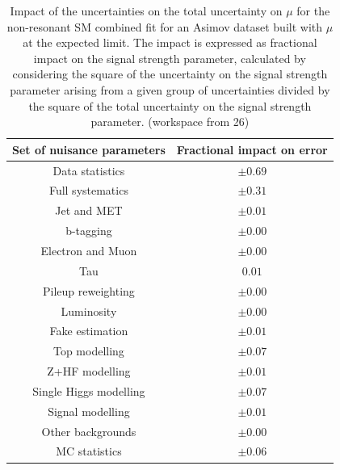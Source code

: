\begin{table}
\centering
\begin{tabular}{|c|c|}
\hline
Set of nuisance parameters & Fractional impact on error\\
\hline
Data statistics & $\pm 0.69$\\
Full systematics & $\pm 0.31$\\
Jet and MET & $\pm 0.01$ \\
b-tagging & $\pm 0.00$\\
Electron and Muon & $\pm 0.00$\\
Tau & $0.01$\\
Pileup reweighting & $\pm 0.00$\\
Luminosity & $\pm 0.00$\\
Fake estimation & $\pm 0.01$\\
Top modelling & $\pm 0.07$\\ 
Z+HF modelling & $\pm 0.01$\\
Single Higgs modelling & $\pm 0.07$\\
Signal modelling & $\pm 0.01$\\
Other backgrounds & $\pm 0.00$\\
MC statistics & $\pm 0.06$\\
\hline
\end{tabular}
\caption{Impact of the uncertainties on the total uncertainty on $\mu$ for the non-resonant SM combined fit for an Asimov dataset built with $\mu$ at the expected limit. The impact is expressed as fractional impact on the signal strength parameter,  calculated by considering the square of the uncertainty on the signal strength parameter arising from a given group of uncertainties divided by the square of the total uncertainty on the signal strength parameter.  (workspace from 26)}
\label{sec:fit:tab:CombBreakdownSMAsimov}
\end{table}

